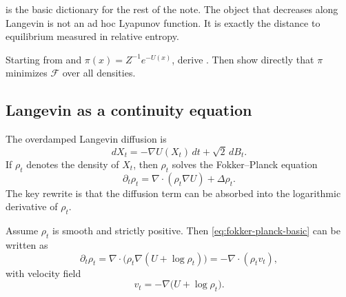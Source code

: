 \documentclass[11pt]{article}
\newif\ifshowsolutions
\newcommand{\SolutionBox}[2][10]{%
  \ifshowsolutions
    \begin{tcolorbox}[stat221panelgray,title={Solution}]
    #2
    \end{tcolorbox}
  \else
    \begin{tcolorbox}[stat221panelgray,unbreakable,title={Workspace}]
    \vspace{#1\baselineskip}
    \end{tcolorbox}
  \fi
}
\begin{document}
 is the basic dictionary for the rest of the note.
The object that decreases along Langevin is not an ad hoc Lyapunov function.
It is exactly the distance to equilibrium measured in relative entropy.

\begin{exercise}
\label{ex:free-energy-gap}
Starting from  and $\pi(x)=Z^{-1}e^{-U(x)}$, derive .
Then show directly that $\pi$ minimizes $\mathcal{F}$ over all densities.
\end{exercise}
\SolutionBox[12]{%
We expand the logarithm of the target:
\[
\log \pi(x)=-U(x)-\log Z.
\]
Therefore
\begin{align*}
  D_{\mathrm{KL}}(\rho\|\pi)
  &=
  \int \rho(x)\log\frac{\rho(x)}{\pi(x)}\,dx \\
  &=
  \int \rho(x)\log \rho(x)\,dx
  +
  \int U(x)\rho(x)\,dx
  +
  \log Z \\
  &=
  \mathcal{F}(\rho)+\log Z.
\end{align*}
Setting $\rho=\pi$ gives
\[
0=D_{\mathrm{KL}}(\pi\|\pi)=\mathcal{F}(\pi)+\log Z,
\]
so $\mathcal{F}(\pi)=-\log Z$, hence
\[
D_{\mathrm{KL}}(\rho\|\pi)=\mathcal{F}(\rho)-\mathcal{F}(\pi).
\]
Because relative entropy is always nonnegative and vanishes only when $\rho=\pi$ almost everywhere, $\pi$ is the unique minimizer of $\mathcal{F}$.%
}

\subsection{Langevin as a continuity equation}
\label{subsec:fokker-planck-continuity}

The overdamped Langevin diffusion is
\begin{equation}
  dX_t=-\nabla U(X_t)\,dt+\sqrt{2}\,dB_t.
  \label{eq:overdamped-langevin}
\end{equation}
If $\rho_t$ denotes the density of $X_t$, then $\rho_t$ solves the Fokker--Planck equation
\begin{equation}
  \partial_t \rho_t
  =
  \nabla\cdot(\rho_t\nabla U)+\Delta \rho_t.
  \label{eq:fokker-planck-basic}
\end{equation}
The key rewrite is that the diffusion term can be absorbed into the logarithmic derivative of $\rho_t$.

\begin{proposition}
\label{prop:fokker-planck-continuity}
Assume $\rho_t$ is smooth and strictly positive.
Then \eqref{eq:fokker-planck-basic} can be written as
\begin{equation}
  \partial_t \rho_t
  =
  \nabla\cdot\!\bigl(\rho_t \nabla(U+\log\rho_t)\bigr)
  =
  -\nabla\cdot(\rho_t v_t),
  \label{eq:fokker-planck-continuity}
\end{equation}
with velocity field
\begin{equation}
  v_t
  =
  -\nabla\bigl(U+\log\rho_t\bigr).
  \label{eq:fokker-planck-velocity}
\end{equation}
\end{proposition}
\end{document}
